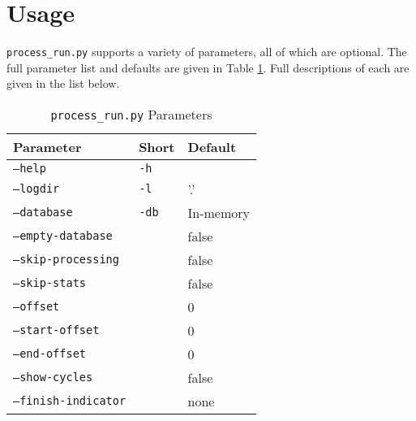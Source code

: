 \section{Usage}
\label{sec:proc_usage}
\par \texttt{process\_run.py} supports a variety of parameters, all of which are optional. The full parameter list and defaults are given in Table \ref{tbl:process_run_param}. Full descriptions of each are given in the list below.

\begin{table}
\caption{\texttt{process\_run.py} Parameters}
\label{tbl:process_run_param}
\centering
\begin{tabular}{l|l|l}
Parameter & Short & Default\\
\hline
\texttt{--help} & \texttt{-h} & \\
\texttt{--logdir} & \texttt{-l} & '.' \\
\texttt{--database} & \texttt{-db} & In-memory\\
\texttt{--empty-database} & & false\\
\texttt{--skip-processing} & & false\\
\texttt{--skip-stats} & & false\\
\texttt{--offset} & & 0\\
\texttt{--start-offset} & & 0\\
\texttt{--end-offset} & & 0\\
\texttt{--show-cycles} & & false\\
\texttt{--finish-indicator} & & none
\end{tabular}
\end{table}

